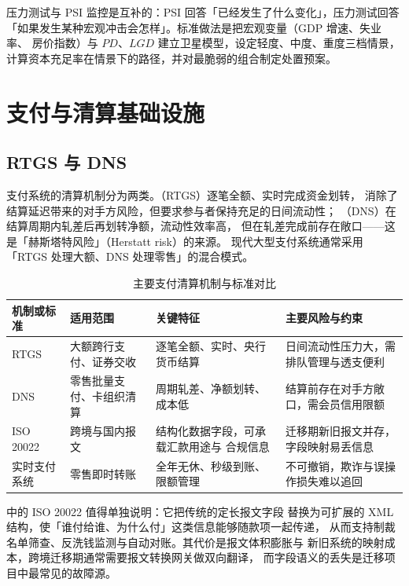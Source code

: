 压力测试与 PSI 监控是互补的：PSI 回答「已经发生了什么变化」，压力测试回答
「如果发生某种宏观冲击会怎样」。标准做法是把宏观变量（GDP 增速、失业率、
房价指数）与 $PD$、$LGD$ 建立卫星模型，设定轻度、中度、重度三档情景，
计算资本充足率在情景下的路径，并对最脆弱的组合制定处置预案。

\section{支付与清算基础设施}

\subsection{RTGS 与 DNS}

支付系统的清算机制分为两类。（RTGS）逐笔全额、实时完成资金划转，
消除了结算延迟带来的对手方风险，但要求参与者保持充足的日间流动性；
（DNS）在结算周期内轧差后再划转净额，流动性效率高，
但在轧差完成前存在敞口——这是「赫斯塔特风险」（Herstatt risk）的来源。
现代大型支付系统通常采用「RTGS 处理大额、DNS 处理零售」的混合模式。

\begin{table}[htbp]
\centering
\caption{主要支付清算机制与标准对比}\label{tab:02-payment}
\tablefont
\begin{tabular}{@{}L{2.4cm}L{3.3cm}L{4.2cm}L{4.3cm}@{}}
\toprule
机制或标准 & 适用范围 & 关键特征 & 主要风险与约束 \\
\midrule
RTGS & 大额跨行支付、证券交收 & 逐笔全额、实时、央行货币结算 &
 日间流动性压力大，需排队管理与透支便利 \\
DNS & 零售批量支付、卡组织清算 & 周期轧差、净额划转、成本低 &
 结算前存在对手方敞口，需会员信用限额 \\
ISO 20022 & 跨境与国内报文 & 结构化数据字段，可承载汇款用途与
 合规信息 & 迁移期新旧报文并存，字段映射易丢信息 \\
实时支付系统 & 零售即时转账 & 全年无休、秒级到账、限额管理 &
 不可撤销，欺诈与误操作损失难以追回 \\
\bottomrule
\end{tabular}
\end{table}

 中的 ISO 20022 值得单独说明：它把传统的定长报文字段
替换为可扩展的 XML 结构，使「谁付给谁、为什么付」这类信息能够随款项一起传递，
从而支持制裁名单筛查、反洗钱监测与自动对账。其代价是报文体积膨胀与
新旧系统的映射成本，跨境迁移期通常需要报文转换网关做双向翻译，
而字段语义的丢失是迁移项目中最常见的故障源。


